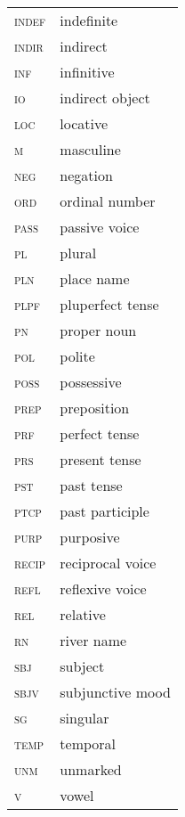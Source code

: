 \begin{tabularx}{.45\textwidth}{ll} 
\textsc{indef} & indefinite\\
\textsc{indir} & indirect\\
\textsc{inf} & infinitive\\
\textsc{io} & indirect object\\
\textsc{loc} & locative\\
\textsc{m} & masculine\\
\textsc{neg} & negation\\
\textsc{ord} & ordinal number\\
\textsc{pass} & passive voice\\
\textsc{pl} & plural\\
\textsc{pln} & place name\\
\textsc{plpf} & pluperfect tense\\
\textsc{pn} & proper noun\\
\textsc{pol} & polite\\
\textsc{poss} & possessive\\
\textsc{prep} & preposition\\
\textsc{prf} & perfect tense\\
\textsc{prs} & present tense\\
\textsc{pst} & past tense\\
\textsc{ptcp} & past participle\\
\textsc{purp} & purposive\\
\textsc{recip} & reciprocal voice\\
\textsc{refl} & reflexive voice\\
\textsc{rel} & relative\\
\textsc{rn} & river name\\
\textsc{sbj} & subject\\
\textsc{sbjv} & subjunctive mood\\
\textsc{sg} & singular\\
\textsc{temp} & temporal\\
\textsc{unm} & unmarked\\
\textsc{v} & vowel
\end{tabularx}




